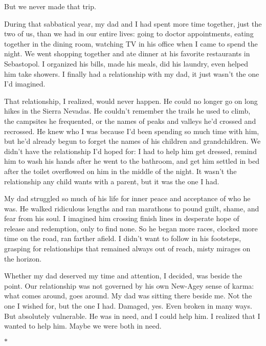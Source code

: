 \documentclass[12pt]{book}
\begin{document}
But we never made that trip.

During that sabbatical year, my dad and I had spent more time together, just the two of us, than we had in our entire lives: going to doctor appointments, eating together in the dining room, watching TV in his office when I came to spend the night. We went shopping together and ate dinner at his favorite restaurants in Sebastopol. I organized his bills, made his meals, did his laundry, even helped him take showers. I finally had a relationship with my dad, it just wasn't the one I'd imagined.

That relationship, I realized, would never happen. He could no longer go on long hikes in the Sierra Nevadas. He couldn't remember the trails he used to climb, the campsites he frequented, or the names of peaks and valleys he'd crossed and recrossed. He knew who I was because I'd been spending so much time with him, but he'd already begun to forget the names of his children and grandchildren. We didn't have the relationship I'd hoped for: I had to help him get dressed, remind him to wash his hands after he went to the bathroom, and get him settled in bed after the toilet overflowed on him in the middle of the night. It wasn't the relationship any child wants with a parent, but it was the one I had.

My dad struggled so much of his life for inner peace and acceptance of who he was. He walked ridiculous lengths and ran marathons to pound guilt, shame, and fear from his soul. I imagined him crossing finish lines in desperate hope of release and redemption, only to find none. So he began more races, clocked more time on the road, ran farther afield. I didn't want to follow in his footsteps, grasping for relationships that remained always out of reach, misty mirages on the horizon.

Whether my dad deserved my time and attention, I decided, was beside the point. Our relationship was not governed by his own New-Agey sense of karma: what comes around, goes around. My dad was sitting there beside me. Not the one I wished for, but the one I had. Damaged, yes. Even broken in many ways. But absolutely vulnerable. He was in need, and I could help him. I realized that I wanted to help him. Maybe we were both in need.

\begin{center}$*$\end{center}
\end{document}
